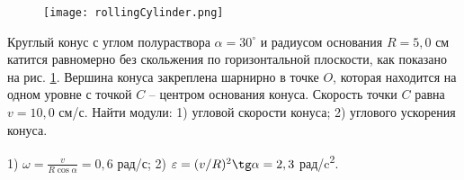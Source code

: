 \begin{ex} %

\begin{figure}[h]
\centering
\texttt{[image: rollingCylinder.png]}
\caption{}
\label{rollingCylinder}
\end{figure}

Круглый конус с углом полураствора $\alpha = 30^{\circ}$ и радиусом основания $R = 5,0$ см катится равномерно без скольжения по горизонтальной плоскости, как показано на рис. \ref{rollingCylinder}. Вершина конуса закреплена шарнирно в точке $O$, которая находится на одном уровне с точкой $C$ -- центром основания конуса. Скорость точки $C$ равна $v = 10,0$ см/с. Найти модули: 1) угловой скорости конуса; 2) углового ускорения конуса.

\begin{ans}
1) $\omega = \frac{v}{R \cos \alpha} = 0,6$ рад/с; 2) $\varepsilon = (v/R)^2 \tg \alpha = 2,3$ рад/c\textsuperscript{2}.
\end{ans}
\end{ex}

\clearpage